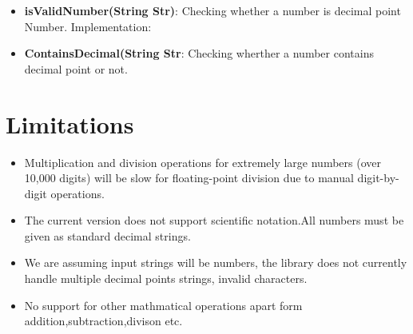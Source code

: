 \documentclass{article}
\begin{document}
\begin{itemize}
    \item \textbf{isValidNumber(String Str)}: Checking whether a number is decimal point Number.
    Implementation: 
    \item \textbf{ContainsDecimal(String Str}: Checking wherther a number contains decimal point or not.
\end{itemize}


\section{Limitations}

\begin{itemize}
    \item Multiplication and division operations for extremely large numbers (over 10,000 digits) will be slow for floating-point division due to manual digit-by-digit operations.
    
    \item The current version does not support scientific notation.All numbers must be given as standard decimal strings.
    
    \item We are assuming input strings will be numbers, the library does not currently handle multiple decimal points strings, invalid characters.

    \item No support for other mathmatical operations apart form addition,subtraction,divison etc.
\end{itemize}
\end{document}
